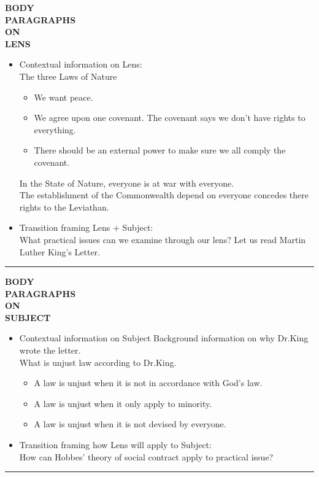 \documentclass{article}
\begin{document}
\begin{paracol}{3}
	\switchcolumn[0]
	\noindent \textbf{BODY}\\
	\noindent \textbf{PARAGRAPHS}\\
	\noindent \textbf{ON}\\
	\noindent \textbf{LENS}
	\switchcolumn[2]
\begin{itemize}
	\item Contextual information on Lens:\\
		The three Laws of Nature
		\begin{itemize}
			\item We want peace.
			\item We agree upon one covenant. The covenant says we don't have rights to everything.
			\item There should be an external power to make sure we all comply the covenant.
		\end{itemize}
		In the State of Nature, everyone is at war with everyone.\\
			The establishment of the Commonwealth depend on everyone concedes there rights to the Leviathan.
	\item Transition framing Lens + Subject:\\
		What practical issues can we examine through our lens? Let us read Martin Luther King's Letter.
\end{itemize}
\end{paracol}
\noindent\rule{16cm}{0.4pt}

\begin{paracol}{3}
	\switchcolumn[0]
	\noindent \textbf{BODY}\\
	\noindent \textbf{PARAGRAPHS}\\
	\noindent \textbf{ON}\\
	\noindent \textbf{SUBJECT}
	\switchcolumn[2]
\begin{itemize}
	\item Contextual information on Subject
		Background information on why Dr.King wrote the letter.\\
		What is unjust law according to Dr.King.
		\begin{itemize}
			\item A law is unjust when it is not in accordance with God's law.
			\item A law is unjust when it only apply to minority.
			\item A law is unjust when it is not devised by everyone.
		\end{itemize}
	\item Transition framing how Lens will apply to Subject:\\
		How can Hobbes' theory of social contract apply to practical issue?
\end{itemize}
\end{paracol}
\noindent\rule{16cm}{0.4pt}
\end{document}
